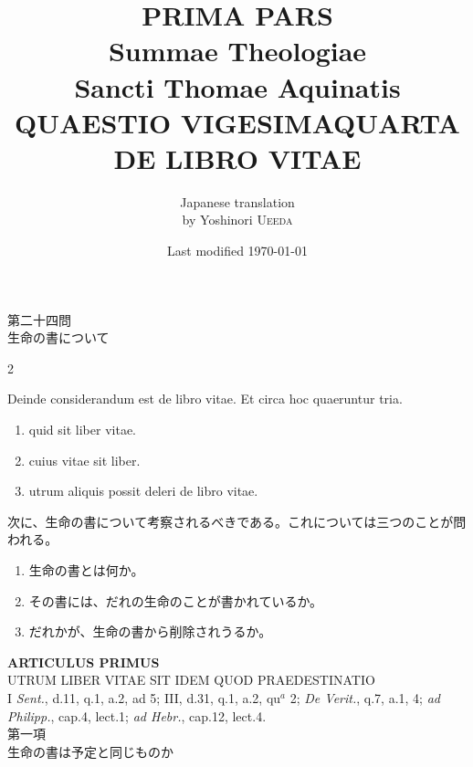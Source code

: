 \documentclass[paper=a4paper,fontsize=10pt,jafontsize=9pt,titlepage]{jlreq}
\title{{\bfseries PRIMA PARS}\\{\Huge Summae Theologiae}\\Sancti Thomae
Aquinatis\\{\sffamily QUAESTIO VIGESIMAQUARTA}\\DE LIBRO VITAE}
\author{Japanese translation\\by Yoshinori {\scshape Ueeda}}
\date{Last modified \today}
\begin{document}
\maketitle
\pagestyle{fancy}


\begin{center}
{\Large 第二十四問\\生命の書について}
\end{center}


\begin{paracol}{2}

Deinde considerandum est de libro vitae. Et circa hoc quaeruntur
 tria. 

\begin{enumerate}
 \item quid sit liber vitae.
 \item cuius vitae sit liber.
 \item utrum aliquis possit deleri de libro vitae.
\end{enumerate}

\switchcolumn

次に、生命の書について考察されるべきである。これについては三つのことが問
 われる。

\begin{enumerate}
 \item 生命の書とは何か。
 \item その書には、だれの生命のことが書かれているか。
 \item だれかが、生命の書から削除されうるか。
\end{enumerate}

\end{paracol}


\newpage
{}
{}
\setcounter{section}{1}
\setcounter{subsection}{0}



\begin{center}
 {\Large {\bfseries ARTICULUS PRIMUS}}\\
 {\large UTRUM LIBER VITAE SIT IDEM QUOD PRAEDESTINATIO}\\
 {\footnotesize I {\itshape Sent.}, d.11, q.1, a.2, ad 5; III, d.31,
 q.1, a.2, qu$^a$ 2;  {\itshape De Verit.}, q.7, a.1, 4; {\itshape ad
 Philipp.}, cap.4, lect.1; {\itshape ad Hebr.}, cap.12, lect.4.}\\
 {\Large 第一項\\生命の書は予定と同じものか}
\end{center}
\end{document}
